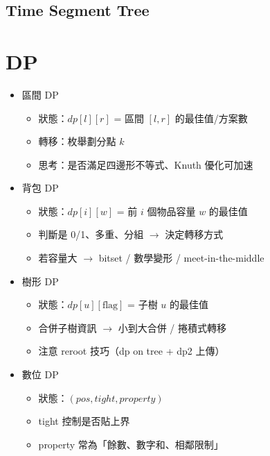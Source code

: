 \documentclass[a4paper,10pt,twocolumn,oneside]{article}
\begin{document}
\subsection{Time Segment Tree}





\section{DP}

\begin{itemize}[nolistsep]
    \item 區間 DP  
        \begin{itemize}[nolistsep]
            \item 狀態：$dp[l][r]$ = 區間 $[l,r]$ 的最佳值/方案數  
            \item 轉移：枚舉劃分點 $k$  
            \item 思考：是否滿足四邊形不等式、Knuth 優化可加速  
        \end{itemize}
    \item 背包 DP  
        \begin{itemize}[nolistsep]
            \item 狀態：$dp[i][w]$ = 前 $i$ 個物品容量 $w$ 的最佳值  
            \item 判斷是 0/1、多重、分組 $\rightarrow$ 決定轉移方式  
            \item 若容量大 $\rightarrow$ bitset / 數學變形 / meet-in-the-middle  
        \end{itemize}
    \item 樹形 DP  
        \begin{itemize}[nolistsep]
            \item 狀態：$dp[u][\text{flag}]$ = 子樹 $u$ 的最佳值  
            \item 合併子樹資訊 $\rightarrow$ 小到大合併 / 捲積式轉移  
            \item 注意 reroot 技巧（dp on tree + dp2 上傳）  
        \end{itemize}
    \item 數位 DP  
        \begin{itemize}[nolistsep]
            \item 狀態：$(pos, tight, property)$  
            \item tight 控制是否貼上界  
            \item property 常為「餘數、數字和、相鄰限制」  
        \end{itemize}

\end{itemize}
\end{document}
